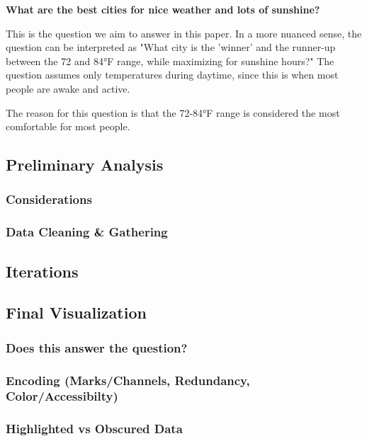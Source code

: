 \documentclass{article}
\begin{document}
\textbf{What are the best cities for nice weather and lots of sunshine?}

This is the question we aim to answer in this paper. In a more nuanced sense,
the question can be interpreted as "What city is the 'winner' and the runner-up between the 72 and 84°F
range, while maximizing for sunshine hours?" The question assumes only temperatures during daytime, since this 
is when most people are awake and active.

The reason for this question is that the 72-84°F range is considered the most comfortable for most people. 


\subsection{Preliminary Analysis}
\subsubsection{Considerations}
\subsubsection{Data Cleaning \& Gathering}

\subsection{Iterations}

\subsection{Final Visualization}
\subsubsection{Does this answer the question?}
\subsubsection{Encoding (Marks/Channels, Redundancy, Color/Accessibilty)}
\subsubsection{Highlighted vs Obscured Data}



\end{document}
